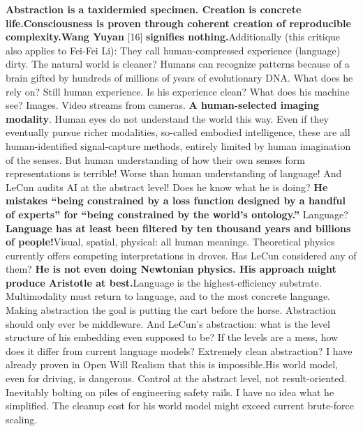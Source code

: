 \documentclass[11pt]{article}
\renewcommand{\\}[1][\mynewlineskip]{\oldnewline[#1]}
\begin{document}
\textbf{Abstraction is a taxidermied specimen. Creation is concrete life.}\\
\textbf{Consciousness is proven through coherent creation of reproducible complexity.}\\
\textbf{Wang Yuyan} [16] \textbf{signifies nothing.}\\
Additionally (this critique also applies to Fei-Fei Li): They call human-compressed experience (language) dirty. The natural world is cleaner? Humans can recognize patterns because of a brain gifted by hundreds of millions of years of evolutionary DNA. What does he rely on? Still human experience. Is his experience clean? What does his machine see? Images. Video streams from cameras.\textbf{ A human-selected imaging modality}. Human eyes do not understand the world this way. Even if they eventually pursue richer modalities, so-called embodied intelligence, these are all human-identified signal-capture methods, entirely limited by human imagination of the senses. But human understanding of how their own senses form representations is terrible! Worse than human understanding of language! And LeCun audits AI at the abstract level! Does he know what he is doing? \textbf{He mistakes ``being constrained by a loss function designed by a handful of experts'' for ``being constrained by the world's ontology.''} Language? \textbf{Language has at least been filtered by ten thousand years and billions of people!}\\
Visual, spatial, physical: all human meanings. Theoretical physics currently offers competing interpretations in droves. Has LeCun considered any of them? \textbf{He is not even doing Newtonian physics. His approach might produce Aristotle at best.}\\
Language is the highest-efficiency substrate. Multimodality must return to language, and to the most concrete language. Making abstraction the goal is putting the cart before the horse. Abstraction should only ever be middleware. And LeCun's abstraction: what is the level structure of his embedding even supposed to be? If the levels are a mess, how does it differ from current language models? Extremely clean abstraction? I have already proven in Open Will Realism that this is impossible.\\
His world model, even for driving, is dangerous. Control at the abstract level, not result-oriented. Inevitably bolting on piles of engineering safety rails. I have no idea what he simplified. The cleanup cost for his world model might exceed current brute-force scaling.\\
\end{document}
